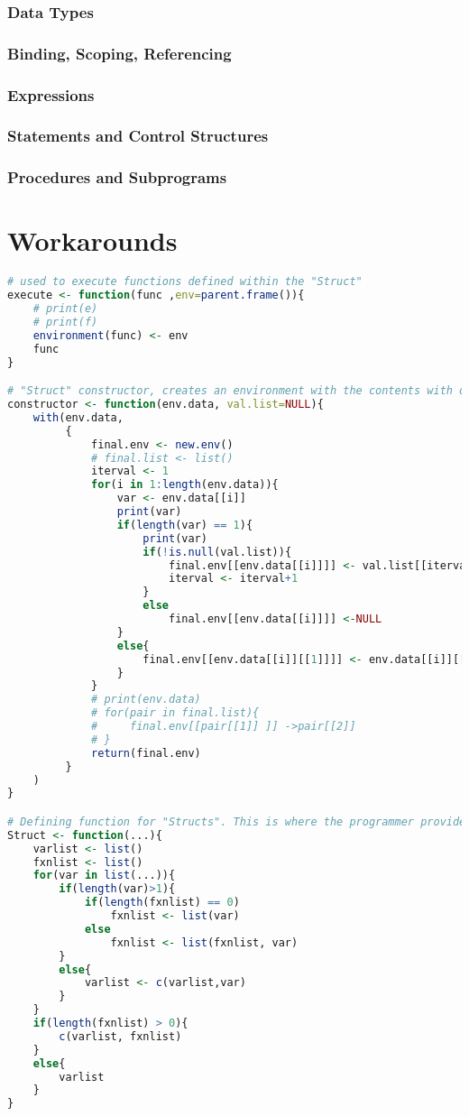 \documentclass[12pt]{article}
\begin{document}
\subsubsection{Data Types}
\subsubsection{Binding, Scoping, Referencing}
\subsubsection{Expressions}
\subsubsection{Statements and Control Structures}
\subsubsection{Procedures and Subprograms}
\fi

\section{Workarounds}
\begin{lstlisting}[language=R]
# used to execute functions defined within the "Struct"
execute <- function(func ,env=parent.frame()){
    # print(e)
    # print(f)
    environment(func) <- env
    func
}

# "Struct" constructor, creates an environment with the contents with or without values
constructor <- function(env.data, val.list=NULL){
    with(env.data,
         {
             final.env <- new.env()
             # final.list <- list()
             iterval <- 1
             for(i in 1:length(env.data)){
                 var <- env.data[[i]]
                 print(var)
                 if(length(var) == 1){
                     print(var)
                     if(!is.null(val.list)){
                         final.env[[env.data[[i]]]] <- val.list[[iterval]]
                         iterval <- iterval+1
                     }
                     else
                         final.env[[env.data[[i]]]] <-NULL
                 }
                 else{
                     final.env[[env.data[[i]][[1]]]] <- env.data[[i]][[2]]
                 }
             }
             # print(env.data)
             # for(pair in final.list){
             #     final.env[[pair[[1]] ]] ->pair[[2]]
             # }
             return(final.env)
         }
    )
}

# Defining function for "Structs". This is where the programmer provides variable names and functions to be used.
Struct <- function(...){
    varlist <- list()
    fxnlist <- list()
    for(var in list(...)){
        if(length(var)>1){
            if(length(fxnlist) == 0)
                fxnlist <- list(var)
            else
                fxnlist <- list(fxnlist, var)
        }
        else{
            varlist <- c(varlist,var)
        }
    }
    if(length(fxnlist) > 0){
        c(varlist, fxnlist)
    }
    else{
        varlist
    }
}
\end{lstlisting}
\end{document}
